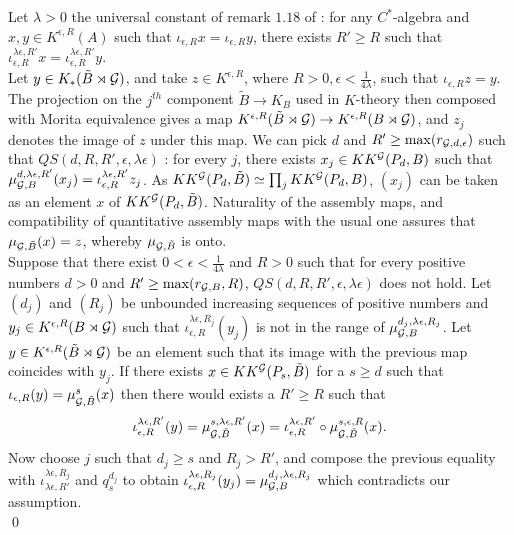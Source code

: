 \begin{dem}
Let $\lambda>0$ the universal constant of remark $1.18$ of \cite{OY2} : for any $C^*$-algebra and $x,y\in K^{\epsilon, R}(A)$ such that $\iota_{\epsilon,R} x =\iota_{\epsilon,R}y$, there exists $R'\geq R$ such that $\iota_{\epsilon,R}^{\lambda\epsilon,R'} x =\iota_{\epsilon,R}^{\lambda\epsilon,R'}y$.\\

Let $y\in K_*(\tilde B\rtimes \mathcal G)$, and take $z\in K^{\epsilon,R}$, where $R>0,\epsilon<\frac{1}{4\lambda}$, such that $\iota_{\epsilon,R}z = y$. The projection on the $j^{th}$ component $\tilde B \rightarrow K_B $ used in $K$-theory then composed with Morita equivalence gives a map $K^{\epsilon,R}(\tilde B\rtimes \mathcal G)\rightarrow K^{\epsilon ,R}(B\rtimes \mathcal G)$, and $z_j$ denotes the image of $z$ under this map. We can pick $d$ and $R'\geq\max (r_{\mathcal G,d,\epsilon})$ such that $QS(d,R,R',\epsilon,\lambda\epsilon)$ : for every $j$, there exists $x_j\in KK^\mathcal G(P_d,B) $ such that $\mu_{\mathcal G,B}^{d,\lambda\epsilon,R'}(x_j)=\iota_{\epsilon,R}^{\lambda\epsilon,R'}z_j$. As $KK^\mathcal G(P_d,\tilde B)\simeq \prod_j KK^\mathcal G(P_d,B)$, $(x_j)$ can be taken as an element $x$ of $KK^\mathcal G(P_d,\tilde B)$. Naturality of the assembly maps, and compatibility of quantitative assembly maps with the usual one assures that $\mu_{\mathcal G,\tilde B}(x)=z$, whereby $\mu_{\mathcal G,\tilde B}$ is onto.\\

Suppose that there exist $0<\epsilon<\frac{1}{4\lambda}$ and $R>0$ such that for every positive numbers $d>0$ and $R'\geq\max (r_{\mathcal G,B},R)$, $QS(d,R,R',\epsilon,\lambda\epsilon)$ does not hold. Let $(d_j)$ and $(R_j)$ be unbounded increasing sequences of positive numbers and $y_j\in K^{\epsilon,R}(B\rtimes \mathcal G)$ such that $\iota_{\epsilon,R}^{\lambda\epsilon,R_j}(y_j)$ is not in the range of $\mu_{\mathcal G,B}^{d_j,\lambda\epsilon,R_j}$. Let $y\in K^{\epsilon,R}(\tilde B\rtimes \mathcal G)$ be an element such that its image with the previous map coincides with $y_j$. If there exists $x\in KK^\mathcal G(P_{s},\tilde B)$ for a $s\geq d$ such that $\iota_{\epsilon,R}( y) =\mu_{\mathcal G,\tilde B}^s(x)$ then there would exists a $R'\geq R$ such that
\[\iota_{\epsilon,R}^{\lambda\epsilon, R'}( y) =\mu_{\mathcal G,\tilde B}^{s,\lambda\epsilon,R'}(x) = \iota_{\epsilon,R}^{\lambda\epsilon, R'}\circ\mu_{\mathcal G,\tilde B}^{s,\epsilon,R}(x).\]
Now choose $j$ such that $d_j\geq s$ and $R_j>R'$, and compose the previous equality with $\iota_{\lambda\epsilon,R'}^{\lambda\epsilon,R_j}$ and $q_s^{d_j}$ to obtain $\iota_{\epsilon,R}^{\lambda\epsilon,R_j}(y_j)=\mu_{\mathcal G,B}^{d_j,\lambda\epsilon,R_j}$ which contradicts our assumption.\\
\qed
\end{dem}





































